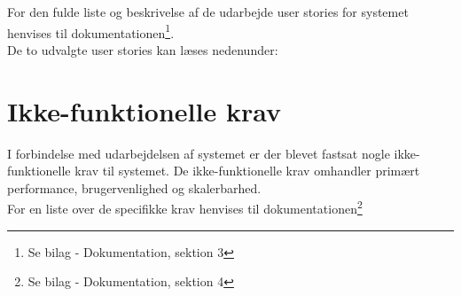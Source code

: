  For den fulde liste og beskrivelse af de udarbejde user stories for systemet henvises til dokumentationen\footnote{Se bilag - Dokumentation, sektion 3}.\\
De to udvalgte user stories kan læses nedenunder:




\section{Ikke-funktionelle krav}
I forbindelse med udarbejdelsen af systemet er der blevet fastsat nogle ikke-funktionelle krav til systemet. De ikke-funktionelle krav omhandler primært performance, brugervenlighed og skalerbarhed.\\ For en liste over de specifikke krav henvises til dokumentationen\footnote{Se bilag - Dokumentation, sektion 4}
